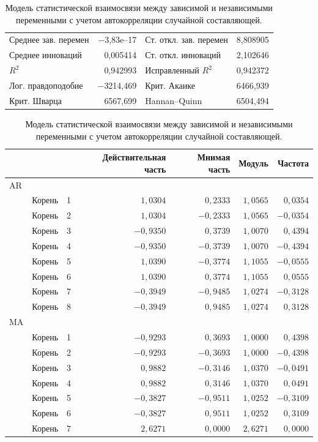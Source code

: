 \documentclass[a4paper,12pt]{article}
\begin{document}
\begin{table}[H]
\begin{center}
	\vspace{1ex}
	\begin{tabular}{lrlr}
		Среднее зав. перемен & $-$3,83\textrm{e--17} & Ст. откл. зав. перемен &  8,808905 \\
		Среднее инноваций &  0,005414 & Ст. откл. инноваций &  2,102646 \\
		$R^2$ &  0,942993 & Исправленный $R^2$ &  0,942372 \\
		Лог. правдоподобие & $-$3214,469 & Крит. Акаике &  6466,939 \\
		Крит. Шварца &  6567,699 & Hannan--Quinn &  6504,494 \\
	\end{tabular}
	
	
	\vspace{1em}
	
	\begin{tabular}{llrrrrr}
		& & & Действительная часть & Мнимая часть & Модуль & Частота \\ \hline
		AR \\ 
		& Корень & 1 & $1,0304$ & $0,2333$ & $1,0565$ & $0,0354$ \\ 
		& Корень & 2 & $1,0304$ & $-0,2333$ & $1,0565$ & $-0,0354$ \\ 
		& Корень & 3 & $-0,9350$ & $0,3739$ & $1,0070$ & $0,4394$ \\ 
		& Корень & 4 & $-0,9350$ & $-0,3739$ & $1,0070$ & $-0,4394$ \\ 
		& Корень & 5 & $1,0390$ & $-0,3774$ & $1,1055$ & $-0,0555$ \\ 
		& Корень & 6 & $1,0390$ & $0,3774$ & $1,1055$ & $0,0555$ \\ 
		& Корень & 7 & $-0,3949$ & $-0,9485$ & $1,0274$ & $-0,3128$ \\ 
		& Корень & 8 & $-0,3949$ & $0,9485$ & $1,0274$ & $0,3128$ \\ 
		MA \\ 
		& Корень & 1 & $-0,9293$ & $0,3693$ & $1,0000$ & $0,4398$ \\ 
		& Корень & 2 & $-0,9293$ & $-0,3693$ & $1,0000$ & $-0,4398$ \\ 
		& Корень & 3 & $0,9882$ & $-0,3146$ & $1,0370$ & $-0,0491$ \\ 
		& Корень & 4 & $0,9882$ & $0,3146$ & $1,0370$ & $0,0491$ \\ 
		& Корень & 5 & $-0,3827$ & $-0,9511$ & $1,0252$ & $-0,3109$ \\ 
		& Корень & 6 & $-0,3827$ & $0,9511$ & $1,0252$ & $0,3109$ \\ 
		& Корень & 7 & $2,6271$ & $0,0000$ & $2,6271$ & $0,0000$ \\ \hline
	\end{tabular}
	
\end{center}
\caption{Модель статистической взаимосвязи между зависимой и независимыми переменными с учетом автокорреляции случайной составляющей.}
\label{tab:table4}
\end{table}
\end{document}
